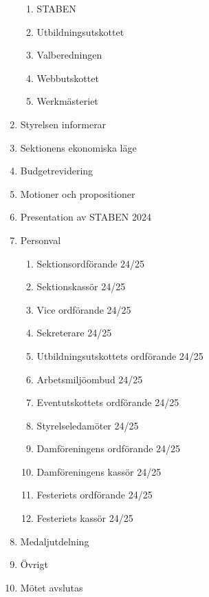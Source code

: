 \documentclass{datateknologsektionen-document}
\begin{document}
\begin{enumerate}[topsep=0pt,itemsep=1ex]
\begin{enumerate}[label*=\arabic*.,leftmargin=3em]
          \item STABEN
          \item Utbildningsutskottet
          \item Valberedningen
          \item Webbutskottet
          \item Werkmästeriet
        \end{enumerate}
  \item Styrelsen informerar
  \item Sektionens ekonomiska läge
  \item Budgetrevidering
  \item Motioner och propositioner
  \item Presentation av STABEN 2024
  \item Personval
        \begin{enumerate}[label*=\arabic*.,leftmargin=3em]
          \item Sektionsordförande 24/25
          \item Sektionskassör 24/25
          \item Vice ordförande 24/25
          \item Sekreterare 24/25
          \item Utbildningsutskottets ordförande 24/25
          \item Arbetsmiljöombud 24/25
          \item Eventutskottets ordförande 24/25
          \item Styrelseledamöter 24/25
          \item Damföreningens ordförande 24/25
          \item Damföreningens kassör 24/25
          \item Festeriets ordförande 24/25
          \item Festeriets kassör 24/25
        \end{enumerate}
  \item Medaljutdelning
  \item Övrigt
  \item Mötet avslutas
\end{enumerate}
\end{document}
